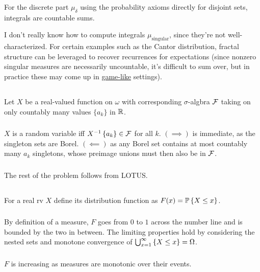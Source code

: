 \documentclass{article}
\begin{document}
   For the discrete part \(\mu_\delta\) using the probability axioms directly for disjoint sets, integrals are countable sums.

   I don't really know how to compute integrals \(\mu_{\mathrm{singular}}\), since they're not well-characterized. For certain examples such as the Cantor distribution, fractal structure can be leveraged to recover recurrences for expectations (since nonzero singular measures are necessarily uncountable, it's difficult to sum over, but in practice these may come up in \href{https://mathoverflow.net/questions/163325/singular-distributions-applications-and-instances}{game-like} settings).


   \subsection{}

   Let \(X\) be a real-valued function on \(\omega\) with corresponding \(\sigma\)-algbra \(\mathcal{F}\) taking on only countably many values \(\{a_k\}\) in \(\mathbb{R}\).
   \subsubsection{}
   \(X\) is a random variable iff \(X^{-1}\left\{{a_k}\right\}\in\mathcal{F}\) for all \(k\). \((\implies)\) is immediate, as the singleton sets are Borel. \((\impliedby)\) as any Borel set contains at most countably many \(a_k\) singletons, whose preimage unions must then also be in \(\mathcal{F}\).
   \subsubsection{}
   The rest of the problem follows from LOTUS.
   \subsection{}
   For a real rv \(X\) define its distribution function as \(F(x)=\operatorname{\mathbb{P}}\left\{{X\le x}\right\}\).
   \subsubsection{}
   By definition of a measure, \(F\) goes from \(0\) to \(1\) across the number line and is bounded by the two in between. The limiting properties hold by considering the nested sets and monotone convergence of \(\bigcup_{x=1}^\infty\left\{{X\le x}\right\}=\Omega\).
     \subsubsection{}
     \(F\) is increasing as measures are monotonic over their events.
\end{document}
